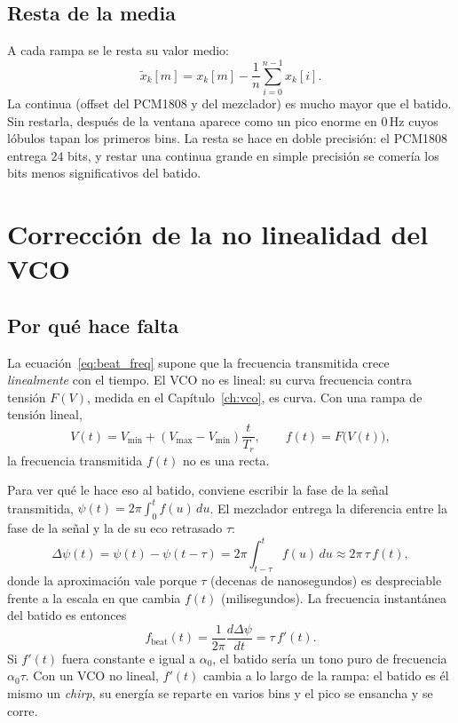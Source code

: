 \subsection{Resta de la media}

A cada rampa se le resta su valor medio:
\begin{equation}
  \tilde x_k[m] = x_k[m] - \frac{1}{n}\sum_{i=0}^{n-1} x_k[i].
\end{equation}
La continua (offset del PCM1808 y del mezclador) es mucho mayor que el
batido. Sin restarla, después de la ventana aparece como un pico enorme en
$0\,\text{Hz}$ cuyos lóbulos tapan los primeros bins. La resta se hace en
doble precisión: el PCM1808 entrega $24$ bits, y restar una continua grande
en simple precisión se comería los bits menos significativos del batido.

\section{Corrección de la no linealidad del VCO}
\label{sec:proc_theta}

\subsection{Por qué hace falta}

La ecuación~\eqref{eq:beat_freq} supone que la frecuencia transmitida crece
\emph{linealmente} con el tiempo. El VCO no es lineal: su curva frecuencia
contra tensión $F(V)$, medida en el Capítulo~\ref{ch:vco}, es curva. Con una
rampa de tensión lineal,
\begin{equation}
  V(t) = V_\text{min} + (V_\text{max} - V_\text{min})\frac{t}{T_r},
  \qquad f(t) = F\bigl(V(t)\bigr),
\end{equation}
la frecuencia transmitida $f(t)$ no es una recta.

Para ver qué le hace eso al batido, conviene escribir la fase de la
señal transmitida, $\psi(t) = 2\pi\int_0^t f(u)\,du$. El mezclador entrega
la diferencia entre la fase de la señal y la de su eco retrasado $\tau$:
\begin{equation}
  \Delta\psi(t) = \psi(t) - \psi(t-\tau)
  = 2\pi\int_{t-\tau}^{t} f(u)\,du \approx 2\pi\,\tau\, f(t),
  \label{eq:proc_fase_batido}
\end{equation}
donde la aproximación vale porque $\tau$ (decenas de nanosegundos) es
despreciable frente a la escala en que cambia $f(t)$ (milisegundos). La
frecuencia instantánea del batido es entonces
\begin{equation}
  f_\text{beat}(t) = \frac{1}{2\pi}\frac{d\Delta\psi}{dt} = \tau\,f'(t).
\end{equation}
Si $f'(t)$ fuera constante e igual a $\alpha_0$, el batido sería un tono
puro de frecuencia $\alpha_0\tau$. Con un VCO no lineal, $f'(t)$ cambia a lo
largo de la rampa: el batido es él mismo un \emph{chirp}, su energía se
reparte en varios bins y el pico se ensancha y se corre.

